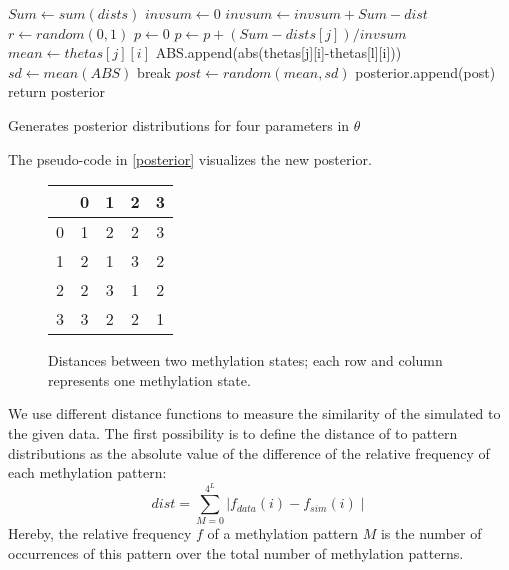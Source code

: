 \begin{algorithm}
\begin{algorithmic}
 
	\State $Sum \gets sum(dists)$
	\State $invsum \gets 0$
		\State $invsum \gets invsum + Sum - dist$
	\EndFor
	\State $r \gets random(0,1)$
	\State $p \gets 0$
		\State $p \gets p + (Sum - dists[j])/invsum$
			\State $mean \gets thetas[j][i]$
				\State ABS.append(abs(thetas[j][i]-thetas[l][i]))
			\EndFor
			\State $sd \gets mean(ABS)$
			\State break
		\EndIf
		\State $post \gets random(mean, sd)$
		\State posterior.append(post)
	\EndFor
\EndFor
\State return posterior
\EndProcedure
\end{algorithmic}
\caption{\label{posterior} Generates posterior distributions for four parameters in $\theta$}
\end{algorithm}
The pseudo-code in \ref{posterior} visualizes the new posterior.\\

\begin{figure}[h]
\centering
\begin{tabularx}{\textwidth}{l|c|c|c|c}
&	0&	1&	2&	3\\
\hline
0&	1&	2&	2&	3\\
1&	2&	1&	3&	2\\
2&	2&	3&	1&	2\\
3&	3&	2&	2&	1
\end{tabularx}
\label{w}
\caption{Distances between two methylation states; each row and column represents one methylation state.}
\end{figure}

We use different distance functions to measure the similarity of the simulated to the given data. The first possibility is to define the distance of to pattern distributions as the absolute value of the difference of the relative frequency of each  methylation pattern:
\[dist = \sum^{4^L}_{M=0}{\mid f_{data}(i) - f_{sim}(i) \mid}\]
Hereby, the relative frequency $f$ of a methylation pattern $M$ is the number of occurrences of this pattern over the total number of methylation patterns.\\

